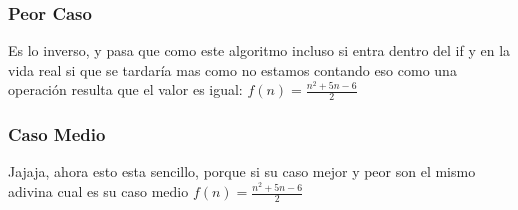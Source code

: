 \documentclass[12pt, fleqn]{article}                            %
\theoremstyle{break}                                            %
\begin{document}
        \subsubsection{Peor Caso}


            Es lo inverso, y pasa que como este algoritmo incluso si entra dentro del if  y en 
            la vida real si que se tardaría mas como no estamos contando eso como una operación resulta
            que el valor es igual:
            $f(n) = \frac{n^2 + 5n - 6}{2}$



        \subsubsection{Caso Medio}

            Jajaja, ahora esto esta sencillo, porque si su caso mejor y peor son el mismo adivina cual es su
            caso medio $f(n) = \frac{n^2 + 5n - 6}{2}$
\end{document}
